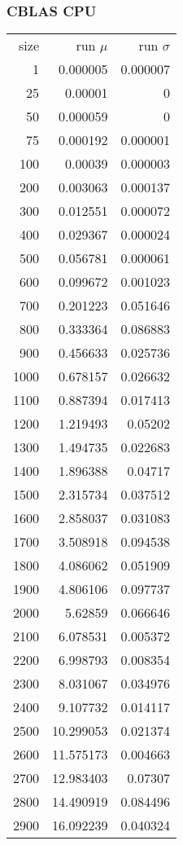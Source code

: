 \subsubsection{CBLAS CPU}

\begin{longtable}{r r r}
size & run $\mu$ & run $\sigma$ \\
1 & 0.000005 & 0.000007 \\
25 & 0.00001 & 0 \\
50 & 0.000059 & 0 \\
75 & 0.000192 & 0.000001 \\
100 & 0.00039 & 0.000003 \\
200 & 0.003063 & 0.000137 \\
300 & 0.012551 & 0.000072 \\
400 & 0.029367 & 0.000024 \\
500 & 0.056781 & 0.000061 \\
600 & 0.099672 & 0.001023 \\
700 & 0.201223 & 0.051646 \\
800 & 0.333364 & 0.086883 \\
900 & 0.456633 & 0.025736 \\
1000 & 0.678157 & 0.026632 \\
1100 & 0.887394 & 0.017413 \\
1200 & 1.219493 & 0.05202 \\
1300 & 1.494735 & 0.022683 \\
1400 & 1.896388 & 0.04717 \\
1500 & 2.315734 & 0.037512 \\
1600 & 2.858037 & 0.031083 \\
1700 & 3.508918 & 0.094538 \\
1800 & 4.086062 & 0.051909 \\
1900 & 4.806106 & 0.097737 \\
2000 & 5.62859 & 0.066646 \\
2100 & 6.078531 & 0.005372 \\
2200 & 6.998793 & 0.008354 \\
2300 & 8.031067 & 0.034976 \\
2400 & 9.107732 & 0.014117 \\
2500 & 10.299053 & 0.021374 \\
2600 & 11.575173 & 0.004663 \\
2700 & 12.983403 & 0.07307 \\
2800 & 14.490919 & 0.084496 \\
2900 & 16.092239 & 0.040324 \\

\end{longtable}
